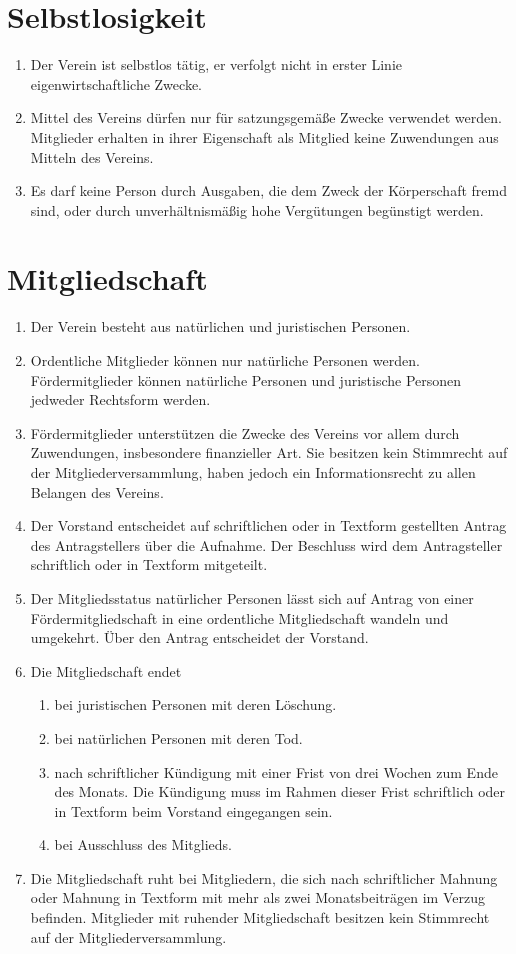 \documentclass[a4paper, 12pt]{scrartcl}
\begin{document}
\section{Selbstlosigkeit}

\begin{enumerate}
  \item Der Verein ist selbstlos tätig, er verfolgt nicht in erster Linie eigenwirtschaftliche Zwecke.
  \item Mittel des Vereins dürfen nur für satzungsgemäße Zwecke verwendet werden. Mitglieder erhalten in ihrer Eigenschaft als Mitglied keine Zuwendungen aus Mitteln des Vereins.
  \item Es darf keine Person durch Ausgaben, die dem Zweck der Körperschaft fremd sind, oder durch unverhältnismäßig hohe Vergütungen begünstigt werden.
\end{enumerate}

\section{Mitgliedschaft}
\begin{enumerate}
  \item Der Verein besteht aus natürlichen und juristischen Personen.
  \item Ordentliche Mitglieder können nur natürliche Personen werden. Fördermitglieder können natürliche Personen und juristische Personen jedweder Rechtsform werden.
  \item Fördermitglieder unterstützen die Zwecke des Vereins vor allem durch Zuwendungen, insbesondere finanzieller Art. Sie besitzen kein Stimmrecht auf der Mitgliederversammlung, haben jedoch ein Informationsrecht zu allen Belangen des Vereins.
  \item Der Vorstand entscheidet auf schriftlichen oder in Textform gestellten Antrag des Antragstellers über die Aufnahme. Der Beschluss wird dem Antragsteller schriftlich oder in Textform mitgeteilt.
  \item Der Mitgliedsstatus natürlicher Personen lässt sich auf Antrag von einer Fördermitgliedschaft in eine ordentliche Mitgliedschaft wandeln und umgekehrt. Über den Antrag entscheidet der Vorstand.
  \item Die Mitgliedschaft endet
  \begin{enumerate}
    \item bei juristischen Personen mit deren Löschung.
    \item bei natürlichen Personen mit deren Tod.
    \item nach schriftlicher Kündigung mit einer Frist von drei Wochen zum Ende des Monats. Die Kündigung muss im Rahmen dieser Frist schriftlich oder in Textform beim Vorstand eingegangen sein.
    \item bei Ausschluss des Mitglieds.
  \end{enumerate}
  \item Die Mitgliedschaft ruht bei Mitgliedern, die sich nach schriftlicher Mahnung oder Mahnung in Textform mit mehr als zwei Monatsbeiträgen im Verzug befinden. Mitglieder mit ruhender Mitgliedschaft besitzen kein Stimmrecht auf der Mitgliederversammlung.
\end{enumerate}
\end{document}
